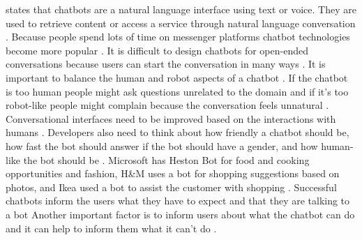 \citet{brandtzaeg2018chatbots} states that chatbots are a natural language interface using text or voice.
They are used to retrieve content or access a service through natural language conversation \cite{brandtzaeg2018chatbots}.
Because people spend lots of time on messenger platforms chatbot technologies become more popular \cite{brandtzaeg2018chatbots}.
It is difficult to design chatbots for open-ended conversations because users can start the conversation
in many ways \cite{brandtzaeg2018chatbots}.
It is important to balance the human and robot aspects of a chatbot \cite{brandtzaeg2018chatbots}.
If the chatbot is too human people might ask questions unrelated to the domain and if it's too robot-like people might
complain because the conversation feels unnatural \cite{brandtzaeg2018chatbots}.
Conversational interfaces need to be improved based on the interactions with humans \cite{brandtzaeg2018chatbots}.
Developers also need to think about how friendly a chatbot should be, how fast the bot should answer if the bot should
have a gender, and how human-like the bot should be \cite{brandtzaeg2018chatbots}.
Microsoft has Heston Bot for food and cooking opportunities and fashion, H\&M uses a bot for shopping 
suggestions based on photos, and Ikea used a bot to assist the customer with shopping \cite{brandtzaeg2018chatbots}.
Successful chatbots inform the users what they have to expect and that they are talking to a bot \cite{brandtzaeg2018chatbots}
Another important factor is to inform users about what the chatbot can do and it can help to inform them what 
it can't do \cite{brandtzaeg2018chatbots}.


